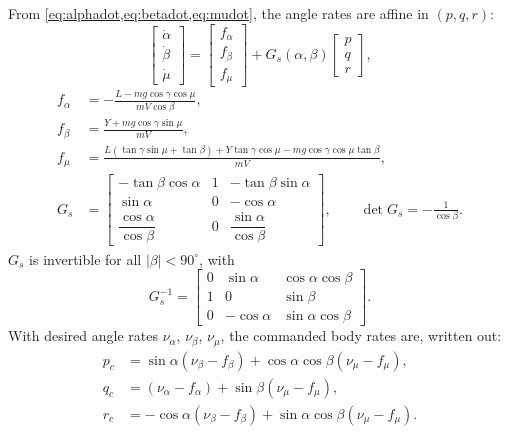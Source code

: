 \documentclass[11pt]{report}
\numberwithin{equation}{chapter}
\begin{document}
From \cref{eq:alphadot,eq:betadot,eq:mudot}, the angle rates are affine in $(p, q, r)$:
\begin{equation}
  \begin{bmatrix}\dot\alpha\\ \dot\beta\\ \dot\mu\end{bmatrix}
  = \begin{bmatrix} f_\alpha\\ f_\beta\\ f_\mu \end{bmatrix}
  + G_s(\alpha,\beta)\begin{bmatrix} p\\ q\\ r\end{bmatrix},
\end{equation}
\begin{align}
  f_\alpha &= -\frac{L - m g\cos\gamma\cos\mu}{m V\cos\beta}, \\
  f_\beta &= \frac{Y + m g\cos\gamma\sin\mu}{m V}, \\
  f_\mu &= \frac{L\left(\tan\gamma\sin\mu + \tan\beta\right) + Y\tan\gamma\cos\mu
            - m g\cos\gamma\cos\mu\tan\beta}{m V}, \\[4pt]
  G_s &= \begin{bmatrix}
    -\tan\beta\cos\alpha & 1 & -\tan\beta\sin\alpha\\
    \sin\alpha & 0 & -\cos\alpha\\
    \dfrac{\cos\alpha}{\cos\beta} & 0 & \dfrac{\sin\alpha}{\cos\beta}
  \end{bmatrix},\qquad
  \det G_s = -\frac{1}{\cos\beta}.
\end{align}
$G_s$ is invertible for all $|\beta|<90^\circ$, with
\begin{equation}
  G_s^{-1} = \begin{bmatrix}
    0 & \sin\alpha & \cos\alpha\cos\beta\\
    1 & 0 & \sin\beta\\
    0 & -\cos\alpha & \sin\alpha\cos\beta
  \end{bmatrix}.
\end{equation}
With desired angle rates $\nu_\alpha$, $\nu_\beta$, $\nu_\mu$, the commanded body rates are,
written out:
\begin{align}
  p_c &= \sin\alpha\left(\nu_\beta - f_\beta\right) + \cos\alpha\cos\beta\left(\nu_\mu - f_\mu\right), \\
  q_c &= \left(\nu_\alpha - f_\alpha\right) + \sin\beta\left(\nu_\mu - f_\mu\right), \\
  r_c &= -\cos\alpha\left(\nu_\beta - f_\beta\right) + \sin\alpha\cos\beta\left(\nu_\mu - f_\mu\right).
\end{align}
\end{document}
